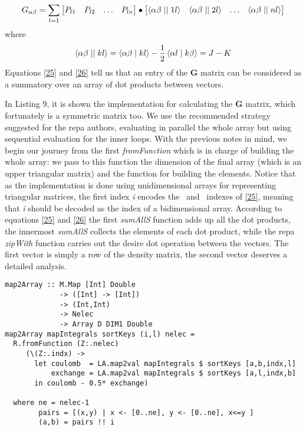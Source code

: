 \documentclass{tmr}
\begin{document}
\begin{equation} \label{25}
G_{\alpha \beta} =
\sum_{l=1}
\begin{bmatrix}
 P_{l1} & P_{l2} & \hdots & P_{ln} \\
\end{bmatrix}
\bullet
\begin{bmatrix}
\braket{\alpha \beta \mid \mid 1 l} & \braket{\alpha \beta \mid \mid 2 l} & 
\hdots & \braket{\alpha \beta \mid \mid n l } \\
\end{bmatrix}
\end{equation}
where 
\begin{equation} \label{26}
\braket{\alpha \beta \mid \mid k l} = 
\braket{\alpha \beta \mid k l} - \frac{1}{2} \braket{\alpha l \mid k \beta} = 
J - K 
\end{equation}
Equations \eqref{25} and \eqref{26} tell us that an entry of the 
\textbf{G} matrix can be considered as a summatory over an array of 
dot products between vectors.

In Listing 9, it is shown the implementation for calculating the \textbf{G} matrix, which
fortunately is a symmetric matrix too.  We use the recommended strategy suggested 
for the repa authors, evaluating in parallel the whole array but using sequential
evaluation for the inner loops. With the previous notes in mind, we begin our journey from
the first \textit{fromFunction} which is in charge of building the whole array: we pass to
this function the dimension of the final array (which is an upper triangular matrix) and 
the function for building the elements. Notice that 
as the implementation is done using unidimensional arrays for representing triangular
matrices, the first index \textit{i} encodes the \textalpha\ and \textbeta\ indexes of
\eqref{25}, meaning that \textit{i} should be decoded as the index of a bidimensional 
array. According to equations \eqref{25} and \eqref{26} the first
\textit{sumAllS} function adds up all the dot products, the innermost \textit{sumAllS}
collects the elements of each dot product, while the repa \textit{zipWith} function carries out
the desire dot operation between the vectors. The first vector is simply a row of the
density matrix, the second vector deserves a detailed analysis. 

\begin{lstlisting}[float,captionpos=b,belowcaptionskip=4pt, caption= The Map to Array Function]
map2Array :: M.Map [Int] Double 
             -> ([Int] -> [Int])
             -> (Int,Int) 
             -> Nelec 
             -> Array D DIM1 Double
map2Array mapIntegrals sortKeys (i,l) nelec = 
  R.fromFunction (Z:.nelec)
     (\(Z:.indx) ->
       let coulomb  = LA.map2val mapIntegrals $ sortKeys [a,b,indx,l]
           exchange = LA.map2val mapIntegrals $ sortKeys [a,l,indx,b]
       in coulomb - 0.5* exchange)
                                                            
  where ne = nelec-1
        pairs = [(x,y) | x <- [0..ne], y <- [0..ne], x<=y ]
        (a,b) = pairs !! i
\end{lstlisting}
 
\end{document}
